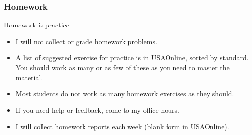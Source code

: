 \begin{frame}
\begin{tabular}{llll}
\end{tabular}

\end{frame}

\begin{frame}\frametitle{Homework}
Homework is practice.
\begin{itemize}
\item I will not collect or grade homework problems.
\item A list of suggested exercise for practice is in USAOnline, sorted by standard.  You should work as many or as few of these as you need to master the material.
\item {} Most students do not work as many homework exercises as they should.
\item If you need help or feedback, come to my office hours.
\item I will collect homework reports each week (blank form in USAOnline).
\end{itemize}
\end{frame}

